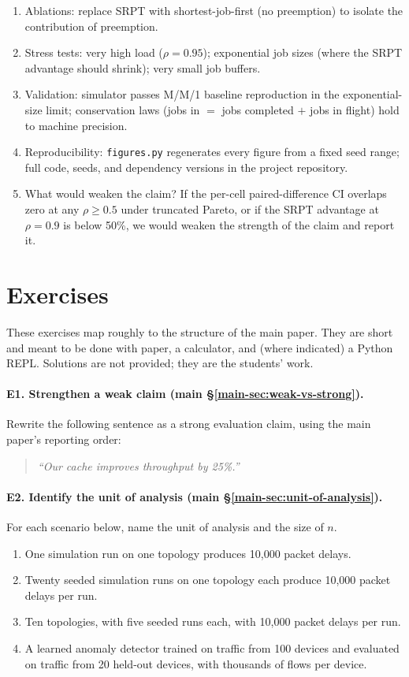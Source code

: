 \documentclass[11pt]{article}
\begin{document}
\begin{enumerate}[leftmargin=*, itemsep=1pt]
    \item Ablations: replace SRPT with shortest-job-first (no preemption) to isolate the contribution of preemption.
    \item Stress tests: very high load ($\rho = 0.95$); exponential job sizes (where the SRPT advantage should shrink); very small job buffers.
    \item Validation: simulator passes M/M/1 baseline reproduction in the exponential-size limit; conservation laws (jobs in $=$ jobs completed $+$ jobs in flight) hold to machine precision.
    \item Reproducibility: \texttt{figures.py} regenerates every figure from a fixed seed range; full code, seeds, and dependency versions in the project repository.
    \item What would weaken the claim? If the per-cell paired-difference CI overlaps zero at any $\rho \geq 0.5$ under truncated Pareto, or if the SRPT advantage at $\rho = 0.9$ is below 50\%, we would weaken the strength of the claim and report it.
\end{enumerate}

\section{Exercises}
\label{sec:exercises}

These exercises map roughly to the structure of the main paper. They are
short and meant to be done with paper, a calculator, and (where indicated)
a Python REPL. Solutions are not provided; they are the students' work.

\paragraph{E1. Strengthen a weak claim (main \S\ref{main-sec:weak-vs-strong}).} Rewrite
the following sentence as a strong evaluation claim, using the main
paper's reporting order:
\begin{quote}
\emph{``Our cache improves throughput by 25\%.''}
\end{quote}

\paragraph{E2. Identify the unit of analysis (main \S\ref{main-sec:unit-of-analysis}).} For each scenario
below, name the unit of analysis and the size of $n$.
\begin{enumerate}[label=(\alph*), leftmargin=*]
    \item One simulation run on one topology produces 10{,}000 packet
    delays.
    \item Twenty seeded simulation runs on one topology each produce
    10{,}000 packet delays per run.
    \item Ten topologies, with five seeded runs each, with 10{,}000 packet
    delays per run.
    \item A learned anomaly detector trained on traffic from 100 devices
    and evaluated on traffic from 20 held-out devices, with thousands of
    flows per device.
\end{enumerate}
\end{document}
